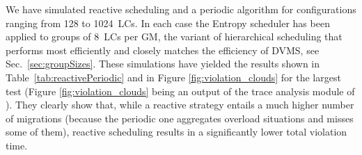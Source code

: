 
We have simulated reactive scheduling and a periodic algorithm for
configurations ranging from 128 to 1024~LCs. In each case the Entropy
scheduler has been applied to groups of 8~LCs per GM, the variant of
hierarchical scheduling that performs most efficiently and closely
matches the efficiency of DVMS, see Sec.~\ref{sec:groupSizes}.
These simulations have yielded the results shown in
Table~\ref{tab:reactivePeriodic} and in Figure
\ref{fig:violation_clouds} for the largest test (Figure \ref{fig:violation_clouds} being an output of the trace
analysis module of \vmps).
They clearly show that, while a
reactive strategy entails a much higher number of migrations (because
the periodic one aggregates overload situations and misses some of
them), reactive scheduling results in a significantly lower total
violation time.






